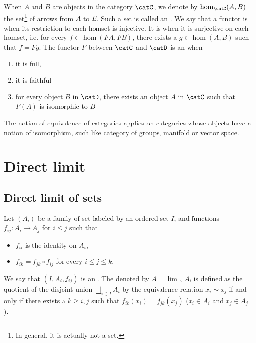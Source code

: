 When $A$ and $B$ are objects in the category $\catC$, we denote by $\hom_{\catC}(A,B)$ the set\footnote{In general, it is actually not a set.} of arrows from $A$ to $B$. Such a set is called an . We say that  a functor is  when its restriction to each homset is injective. It is  when it is surjective on each homset, i.e. for every $f\in \hom(FA,FB)$, there exists a $g\in \hom(A,B)$ such that $f=Fg$. The functor $F$ between $\catC$ and $\catD$ is an  when
\begin{enumerate}
	\item it is full,
	\item it is faithful
	\item for every object $B$ in $\catD$, there exists an object $A$ in $\catC$ such that $F(A)$ is isomorphic to $B$.
\end{enumerate}
The notion of equivalence of categories applies on categories whose objects have a notion of isomorphism, such like category of groups, manifold or vector space.

\section{Direct limit}
\label{SecDirectLimit}

\subsection{Direct limit of sets}

Let $(A_i)$ be a family of set labeled by an ordered set $I$, and functions $f_{ij}\colon A_i\to A_j$ for $i\leq j$ such that
\begin{itemize}
	\item $f_{ii}$ is the identity on $A_i$,
	\item $f_{ik}=f_{jk}\circ f_{ij}$ for every $i\leq j\leq k$.
\end{itemize}
We say that $(I,A_i,f_{ij})$ is an . The  denoted by $A=\lim_{\rightarrow}A_i$ is defined as the quotient of the disjoint union $\bigsqcup_{i\in I}A_i$ by the equivalence relation $x_i\sim x_j$ if and only if there exists a $k\geq i,j$ such that $f_{ik}(x_i)=f_{jk}(x_j)$ ($x_i\in A_i$ and $x_j\in A_j$).

